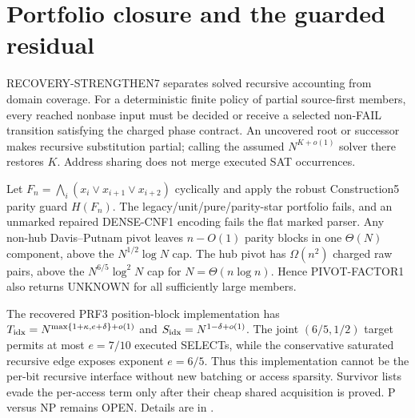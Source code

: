\section{Portfolio closure and the guarded residual}
RECOVERY-STRENGTHEN7 separates solved recursive accounting from domain
coverage.  For a deterministic finite policy of partial source-first members,
every reached nonbase input must be decided or receive a selected non-FAIL
transition satisfying the charged phase contract.  An uncovered root or
successor makes recursive substitution partial; calling the assumed
$N^{K+o(1)}$ solver there restores $K$.  Address sharing does not merge
executed SAT occurrences.

Let $F_n=\bigwedge_i(x_i\vee x_{i+1}\vee x_{i+2})$ cyclically and apply the
robust Construction5 parity guard $H(F_n)$.  The legacy/unit/pure/parity-star
portfolio fails, and an unmarked repaired DENSE-CNF1 encoding fails the flat
marked parser.  Any non-hub Davis--Putnam pivot leaves
$n-O(1)$ parity blocks in one $\Theta(N)$ component, above the
$N^{1/2}\log N$ cap.  The hub pivot has $\Omega(n^2)$ charged raw pairs,
above the $N^{6/5}\log^2N$ cap for $N=\Theta(n\log n)$.  Hence
PIVOT-FACTOR1 also returns UNKNOWN for all sufficiently large members.

The recovered PRF3 position-block implementation has
$T_{\rm idx}=N^{\max\{1+\kappa,e+\delta\}+o(1)}$ and
$S_{\rm idx}=N^{1-\delta+o(1)}$.  The joint $(6/5,1/2)$ target permits at
most $e=7/10$ executed SELECTs, while the conservative saturated recursive
edge exposes exponent $e=6/5$.  Thus this implementation cannot be the
per-bit recursive interface without new batching or access sparsity.
Survivor lists evade the per-access term only after their cheap shared
acquisition is proved.  P versus NP remains OPEN.  Details are in
.
